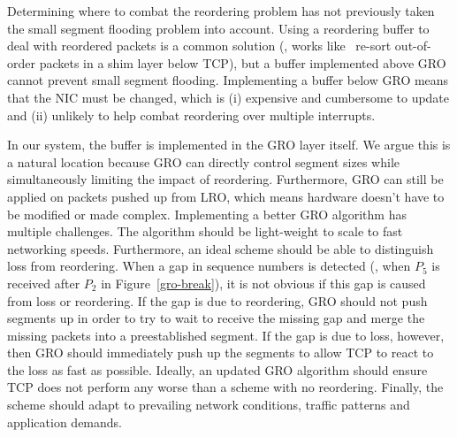 Determining where to combat the reordering problem has not previously taken the small segment flooding problem into account.  Using a reordering buffer to deal with reordered packets is a common solution (\eg{}, works like~\cite{drb} re-sort out-of-order packets in a shim layer below TCP), but a buffer implemented above GRO cannot prevent small segment flooding.  Implementing a buffer below GRO means that the NIC must be changed, which is (i) expensive and cumbersome to update and (ii) unlikely to help combat reordering over multiple interrupts.

In our system, the buffer is implemented in the GRO layer itself.  We argue this is a natural location because GRO can
directly control segment sizes while simultaneously limiting the impact of reordering. 
Furthermore, GRO can still be applied on packets pushed up from LRO, which means hardware doesn't have to be modified
or made complex.
Implementing a better GRO algorithm has multiple challenges. The algorithm should be light-weight to scale to fast networking speeds. Furthermore, an ideal scheme should be able to distinguish loss from reordering.  When a gap in sequence numbers is detected (\eg{}, when $P_5$ is received after $P_2$ in Figure~\ref{gro-break}), it is not obvious if this gap is caused from loss or reordering.  If the gap is due to reordering, GRO should not push segments up in order to try to wait to receive the missing gap and merge the missing packets into a preestablished segment.  If the gap is due to loss, however, then GRO should immediately push up the segments to allow TCP to react to the loss as fast as possible. Ideally, an updated GRO algorithm should ensure TCP does not perform any worse than a scheme with no reordering. Finally, the scheme should adapt to prevailing network conditions, traffic patterns and application demands.



